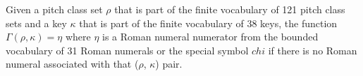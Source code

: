 
Given a pitch class set $\rho$ that is part of the finite
vocabulary of 121 pitch class sets and a key $\kappa$ that
is part of the finite vocabulary of 38 keys, the function
$\Gamma(\rho, \kappa) = \eta$ where $\eta$ is a Roman
numeral numerator from the bounded vocabulary of 31 Roman
numerals or the special symbol $chi$ if there is no Roman
numeral associated with that ($\rho$, $\kappa$) pair.
